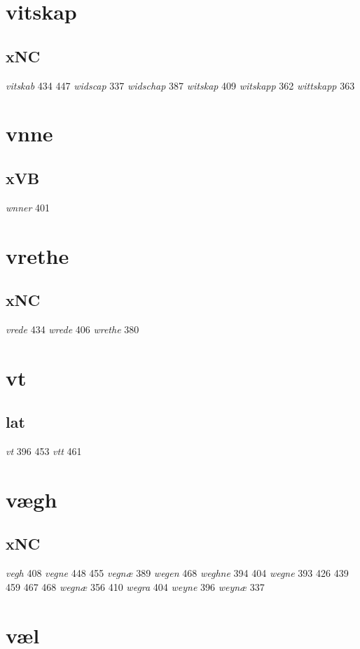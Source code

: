 \documentclass[a4paper,twocolumn]{article}
\begin{document}
\section{vitskap}
\label{sec:orgd5f0a7a}
\subsection{xNC}
\label{sec:orgf6beb45}
\emph{vitskab} 434 447 \emph{widscap} 337 \emph{widschap} 387 \emph{witskap} 409 \emph{witskapp} 362 \emph{wittskapp} 363 
\section{vnne}
\label{sec:org132be8d}
\subsection{xVB}
\label{sec:org13665e4}
\emph{wnner} 401 
\section{vrethe}
\label{sec:orga2242a1}
\subsection{xNC}
\label{sec:org9895786}
\emph{vrede} 434 \emph{wrede} 406 \emph{wrethe} 380 
\section{vt}
\label{sec:orgfd36d93}
\subsection{lat}
\label{sec:org93e577a}
\emph{vt} 396 453 \emph{vtt} 461 
\section{vægh}
\label{sec:org17a8fad}
\subsection{xNC}
\label{sec:orga91e4ca}
\emph{vegh} 408 \emph{vegne} 448 455 \emph{vegnæ} 389 \emph{wegen} 468 \emph{weghne} 394 404 \emph{wegne} 393 426 439 459 467 468 \emph{wegnæ} 356 410 \emph{wegra} 404 \emph{weyne} 396 \emph{weynæ} 337 
\section{væl}
\label{sec:orgd1e8cb5}
\end{document}
